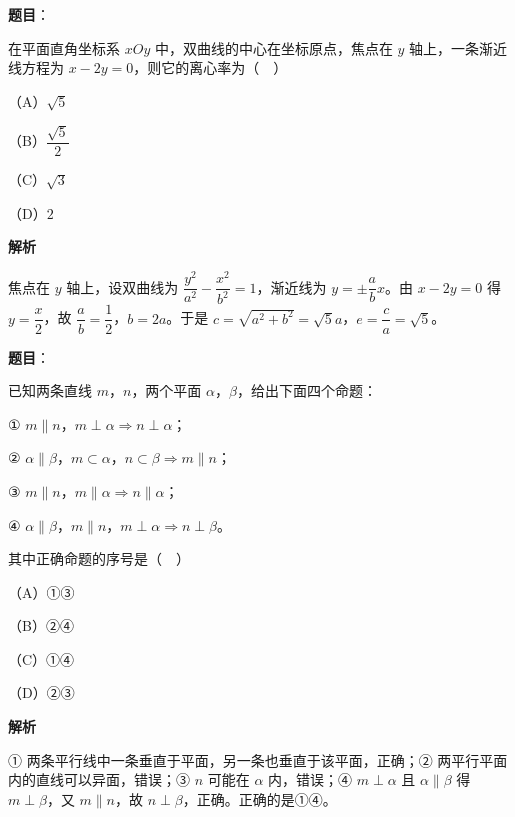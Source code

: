\begin{answer}

\textbf{题目}：

在平面直角坐标系 $xOy$ 中，双曲线的中心在坐标原点，焦点在 $y$ 轴上，一条渐近线方程为 $x-2y=0$，则它的离心率为（　）

（A）$\sqrt5$

（B）$\dfrac{\sqrt5}{2}$

（C）$\sqrt3$

（D）$2$

\textbf{解析}

焦点在 $y$ 轴上，设双曲线为 $\dfrac{y^2}{a^2}-\dfrac{x^2}{b^2}=1$，渐近线为 $y=\pm\dfrac abx$。由 $x-2y=0$ 得 $y=\dfrac x2$，故 $\dfrac ab=\dfrac12$，$b=2a$。于是 $c=\sqrt{a^2+b^2}=\sqrt5a$，$e=\dfrac ca=\sqrt5$。


\end{answer}
\begin{answer}

\textbf{题目}：

已知两条直线 $m$，$n$，两个平面 $\alpha$，$\beta$，给出下面四个命题：

① $m\parallel n$，$m\perp\alpha\Rightarrow n\perp\alpha$；

② $\alpha\parallel\beta$，$m\subset\alpha$，$n\subset\beta\Rightarrow m\parallel n$；

③ $m\parallel n$，$m\parallel\alpha\Rightarrow n\parallel\alpha$；

④ $\alpha\parallel\beta$，$m\parallel n$，$m\perp\alpha\Rightarrow n\perp\beta$。

其中正确命题的序号是（　）

（A）①③

（B）②④

（C）①④

（D）②③

\textbf{解析}

① 两条平行线中一条垂直于平面，另一条也垂直于该平面，正确；② 两平行平面内的直线可以异面，错误；③ $n$ 可能在 $\alpha$ 内，错误；④ $m\perp\alpha$ 且 $\alpha\parallel\beta$ 得 $m\perp\beta$，又 $m\parallel n$，故 $n\perp\beta$，正确。正确的是①④。


\end{answer}
